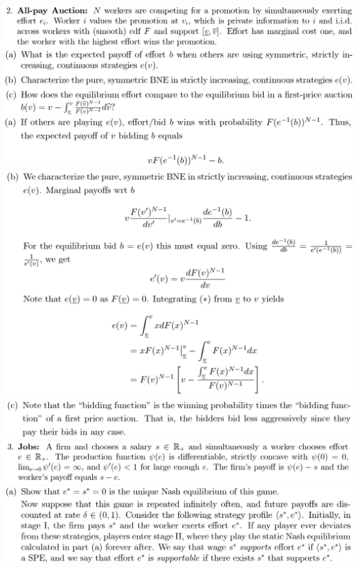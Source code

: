 \documentclass[8pt,landscape]{extarticle}
\begin{document}
\begin{multicols*}{3}
    \includegraphics[width=0.85\linewidth,keepaspectratio]{Screenshots/Screenshot 2024-03-11 133158.png}
    \includegraphics[width=0.81\linewidth,keepaspectratio]{Screenshots/Screenshot 2024-03-11 133205.png}
    \includegraphics[width=0.73\linewidth,keepaspectratio]{Screenshots/Screenshot 2024-03-11 133212.png}
    \includegraphics[width=0.73\linewidth,keepaspectratio]{Screenshots/Screenshot 2024-03-11 133221.png}
    \includegraphics[width=0.74\linewidth,keepaspectratio]{Screenshots/Screenshot 2024-03-11 133227.png}
    \includegraphics[width=0.86\linewidth,keepaspectratio]{Screenshots/Screenshot 2024-03-11 133235.png}
    \includegraphics[width=0.81\linewidth,keepaspectratio]{Screenshots/Screenshot 2024-03-11 133241.png}

\end{multicols*}
\end{document}

